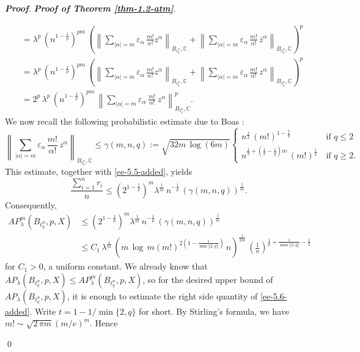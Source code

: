 \documentclass[a4paper,11pt, reqno]{amsart}
\theoremstyle{definition}
\newenvironment{pf}[1][]{%
	\vskip 3mm
	\noindent
	\ifthenelse{\equal{#1}{}}%
	{{\slshape {\bf Proof}. }}%
	{{\slshape #1.} }%
}%
{\qed\bigskip}
\newcommand{\norm}[1]{\left\lVert#1\right\rVert}
\begin{document}
\begin{pf}[{\bf Proof of Theorem \ref{thm-1.2-atm}}]
\begin{align}
& = \lambda^p\, \left(n^{1-\frac{1}{p}}\right)^{pm}\, \left(\norm{\sum_{|\alpha|=m} \varepsilon_{\alpha}\, \frac{m!}{\alpha!}z^{\alpha}}_{B_{\ell^n_q},\mathbb{C}} + \norm{\sum_{|\alpha|=m} \varepsilon_{\alpha}\,\frac{m!}{\alpha!}\, \bar{z}^{\alpha}}_{B_{\ell^n_q},\mathbb{C}}\right)^p \nonumber\\
&= \lambda^p\, \left(n^{1-\frac{1}{p}}\right)^{pm}\, \left(\norm{\sum_{|\alpha|=m} \varepsilon_{\alpha}\, \frac{m!}{\alpha!}z^{\alpha}}_{B_{\ell^n_q},\mathbb{C}} + \norm{\sum_{|\alpha|=m} \varepsilon_{\alpha}\,\frac{m!}{\alpha!}\, z^{\alpha} }_{B_{\ell^n_q},\mathbb{C}}\right)^p \nonumber\\
&= 2^p\, \lambda^p\, \left(n^{1-\frac{1}{p}}\right)^{pm}\,\norm{\sum_{|\alpha|=m} \varepsilon_{\alpha}\,\frac{m!}{\alpha!}\, z^{\alpha} }^p_{B_{\ell^n_q},\mathbb{C}}.
\end{align}
We now recall the following probabilistic estimate due to Boas \cite[Theorem 4]{boas-2000}:
\begin{equation*}
\norm{\sum_{|\alpha|=m} \varepsilon_{\alpha}\,\frac{m!}{\alpha!}\, z^{\alpha} }_{B_{\ell^n_q},\mathbb{C}} \leq 
\gamma(m,n,q):= \sqrt{32m\, \log(6m)}
\begin{cases}
n^{\frac{1}{2}}\, (m!)^{1-\frac{1}{q}}\, & \mbox{if}\,\, q \leq 2 \\
n^{\frac{1}{2}+ \left(\frac{1}{2}-\frac{1}{q}\right)m}\, (m!)^{\frac{1}{2}}\, & \mbox{if}\,\, q \geq 2.
\end{cases}
\end{equation*}
This estimate, together with \eqref{ee-5.5-added}, yields
\begin{equation*}
	\frac{\sum_{i=1}^{n}r_i}{n} \leq \left(2^{1-\frac{1}{p}}\right)^m \lambda^{\frac{1}{m}}\, n^{-\frac{1}{p}}\, (\gamma(m,n,q))^{\frac{1}{m}}.
\end{equation*}
Consequently,
\begin{align} \label{ee-5.6-added}
AP^m_{\lambda}(B_{\ell^n_q}, p,X) 
& \leq \left(2^{1-\frac{1}{p}}\right)^m \lambda^{\frac{1}{m}}\, n^{-\frac{1}{p}}\, (\gamma(m,n,q))^{\frac{1}{m}} \nonumber\\
& \leq C_{1}\,\lambda^{\frac{1}{m}}\, \left(m\, \log\,m (m!)^{2 \left(1-\frac{1}{\min\{2,q\}}\right)}\,n\right)^{\frac{1}{2m}}\, \left(\frac{1}{n}\right)^{\frac{1}{p}+\frac{1}{\max\{2,q\}}-\frac{1}{2}} 
\end{align}
for $C_1>0$, a uniform constant. We already know that $AP_{\lambda}(B_{\ell^n_q}, p,X) \leq AP^m_{\lambda}(B_{\ell^n_q}, p,X)$, so for the desired upper bound of $AP_{\lambda}(B_{\ell^n_q}, p,X) $, it is enough to estimate the right side quantity of  \eqref{ee-5.6-added}. Write $t=1-1/\min\{2,q\}$ for short. By Stirling's formula, we have $m! \sim \sqrt{2\, \pi m} (m/e)^m$. Hence

\end{pf}
\end{document}
